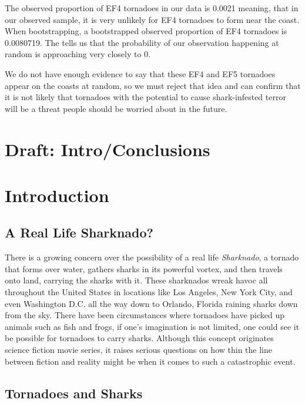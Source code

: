 \documentclass[
  letterpaper,
  DIV=11,
  numbers=noendperiod]{scrreprt}
\begin{document}
The observed proportion of EF4 tornadoes in our data is 0.0021 meaning,
that in our observed sample, it is very unlikely for EF4 tornadoes to
form near the coast. When bootstrapping, a bootstrapped observed
proportion of EF4 tornadoes is 0.0080719. The tells us that the
probability of our observation happening at random is approaching very
closely to 0.

We do not have enough evidence to say that these EF4 and EF5 tornadoes
appear on the coasts at random, so we must reject that idea and can
confirm that it is not likely that tornadoes with the potential to cause
shark-infested terror will be a threat people should be worried about in
the future.

\chapter{Draft: Intro/Conclusions}\label{draft-introconclusions}

\chapter{Introduction}\label{introduction-1}

\section{A Real Life Sharknado?}\label{a-real-life-sharknado}

There is a growing concern over the possibility of a real life
\emph{Sharknado}, a tornado that forms over water, gathers sharks in its
powerful vortex, and then travels onto land, carrying the sharks with
it. These sharknados wreak havoc all throughout the United States in
locations like Los Angeles, New York City, and even Washington D.C. all
the way down to Orlando, Florida raining sharks down from the sky. There
have been circumstances where tornadoes have picked up animals such as
fish and frogs, if one's imagination is not limited, one could see it be
possible for tornadoes to carry sharks. Although this concept originates
science fiction movie series, it raises serious questions on how thin
the line between fiction and reality might be when it comes to such a
catastrophic event.

\section{Tornadoes and Sharks}\label{tornadoes-and-sharks}
\end{document}
